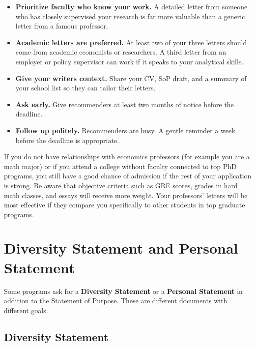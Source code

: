 \documentclass[11pt, letterpaper]{article}
\begin{document}
\begin{itemize}[leftmargin=*, itemsep=2pt]
    \item \textbf{Prioritize faculty who know your work.} A detailed letter from someone who has closely supervised your research is far more valuable than a generic letter from a famous professor.
    \item \textbf{Academic letters are preferred.} At least two of your three letters should come from academic economists or researchers. A third letter from an employer or policy supervisor can work if it speaks to your analytical skills.
    \item \textbf{Give your writers context.} Share your CV, SoP draft, and a summary of your school list so they can tailor their letters.
    \item \textbf{Ask early.} Give recommenders at least two months of notice before the deadline.
    \item \textbf{Follow up politely.} Recommenders are busy. A gentle reminder a week before the deadline is appropriate.
\end{itemize}

\begin{tipbox}
If you do not have relationships with economics professors (for example you are a math major) or if you attend a college without faculty connected to top PhD programs, you still have a good chance of admission if the rest of your application is strong. Be aware that objective criteria such as GRE scores, grades in hard math classes, and essays will receive more weight. Your professors' letters will be most effective if they compare you specifically to other students in top graduate programs.
\end{tipbox}


\section{Diversity Statement and Personal Statement}

Some programs ask for a \textbf{Diversity Statement} or a \textbf{Personal Statement} in addition to the Statement of Purpose. These are different documents with different goals.

\subsection{Diversity Statement}
\end{document}
